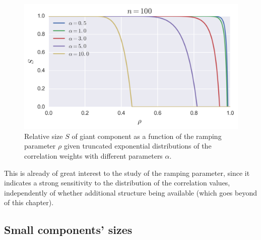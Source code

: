 \begin{figure}[tb]
	\centering
	\includegraphics[scale=.8]{figures/3_exponential_giant_component.png}
	\caption{Relative size $S$ of giant component as a function of the ramping parameter $\rho$ given truncated exponential distributions  of the correlation weights with different parameters $\alpha$.}
	\label{fig:exponential_giant_component}
\end{figure}
This is already of great interest to the study of the ramping parameter, since it indicates a strong sensitivity to the distribution of the correlation values, independently of whether additional structure being available (which goes beyond of this chapter).





\subsection{Small components' sizes} %
\label{sub:component_sizes}

